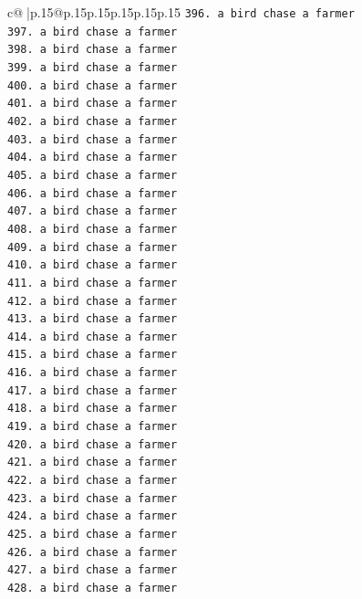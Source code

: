 \documentclass{article}
\begin{document}
{\begin{supertabular}{c@{$\;$}|p{.15\linewidth}@{}p{.15\linewidth}p{.15\linewidth}p{.15\linewidth}p{.15\linewidth}p{.15\linewidth}}
{{{\texttt{396. a bird chase a farmer} \\
\texttt{397. a bird chase a farmer} \\
\texttt{398. a bird chase a farmer} \\
\texttt{399. a bird chase a farmer} \\
\texttt{400. a bird chase a farmer} \\
\texttt{401. a bird chase a farmer} \\
\texttt{402. a bird chase a farmer} \\
\texttt{403. a bird chase a farmer} \\
\texttt{404. a bird chase a farmer} \\
\texttt{405. a bird chase a farmer} \\
\texttt{406. a bird chase a farmer} \\
\texttt{407. a bird chase a farmer} \\
\texttt{408. a bird chase a farmer} \\
\texttt{409. a bird chase a farmer} \\
\texttt{410. a bird chase a farmer} \\
\texttt{411. a bird chase a farmer} \\
\texttt{412. a bird chase a farmer} \\
\texttt{413. a bird chase a farmer} \\
\texttt{414. a bird chase a farmer} \\
\texttt{415. a bird chase a farmer} \\
\texttt{416. a bird chase a farmer} \\
\texttt{417. a bird chase a farmer} \\
\texttt{418. a bird chase a farmer} \\
\texttt{419. a bird chase a farmer} \\
\texttt{420. a bird chase a farmer} \\
\texttt{421. a bird chase a farmer} \\
\texttt{422. a bird chase a farmer} \\
\texttt{423. a bird chase a farmer} \\
\texttt{424. a bird chase a farmer} \\
\texttt{425. a bird chase a farmer} \\
\texttt{426. a bird chase a farmer} \\
\texttt{427. a bird chase a farmer} \\
\texttt{428. a bird chase a farmer} \\
}}}
\end{supertabular}}
\end{document}
